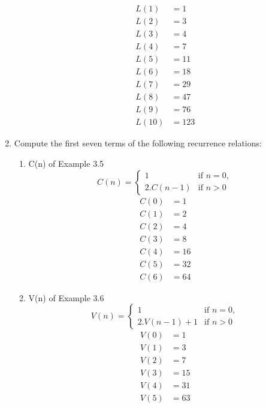\documentclass[12pt]{article}
\begin{document}
\begin{enumerate}
\begin{enumerate}
\begin{align*}
            L(1) &= 1\\
            L(2) &= 3\\
            L(3) &= 4\\
            L(4) &= 7\\
            L(5) &= 11\\
            L(6) &= 18\\
            L(7) &= 29\\
            L(8) &= 47\\
            L(9) &= 76\\
            L(10) &= 123
        \end{align*}
    \end{enumerate}
    \newpage
    \item Compute the first seven terms of the following recurrence relations:
    \begin{enumerate}
        \item C(n) of Example 3.5
        \[
        C(n) = 
        \begin{cases} 
        1 &     \text{if } n = 0, \\
        2.C(n-1) & \text{if } n > 0 
        \end{cases}
        \]
        \begin{align*}
            C(0) &= 1\\
            C(1) &= 2\\
            C(2) &= 4\\
            C(3) &= 8\\
            C(4) &= 16\\
            C(5) &= 32\\
            C(6) &= 64
        \end{align*}
        \item V(n) of Example 3.6
        \[
        V(n) = 
        \begin{cases} 
        1 &     \text{if } n = 0, \\
        2.V(n-1) + 1 & \text{if } n > 0 
        \end{cases}
        \]
        \begin{align*}
            V(0) &= 1\\
            V(1) &= 3\\
            V(2) &= 7\\
            V(3) &= 15\\
            V(4) &= 31\\
            V(5) &= 63\\

\end{align*}
\end{enumerate}
\end{enumerate}
\end{document}
